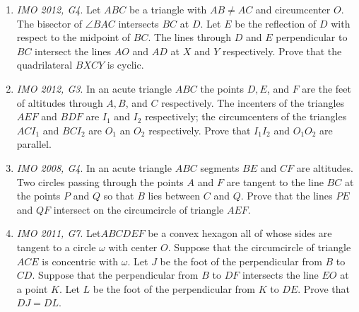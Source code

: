 \documentclass[11pt,a4paper]{article}
\begin{document}
\begin{enumerate}
\item\emph {IMO 2012, G4}. Let $ABC$ be a triangle with $AB\neq AC$ and circumcenter $O$. The bisector of $\angle BAC$ intersects $BC$ at $D$. Let $E$ be the reflection of $D$ with respect to the midpoint of $BC$. The lines through $D$ and $E$ perpendicular to $BC$ intersect the lines $AO$ and $AD$ at $X$ and $Y$ respectively. Prove that the quadrilateral $BXCY$ is cyclic.

\item\emph {IMO 2012, G3}. In an acute triangle $ABC$ the points $D, E$, and $F$ are the feet of altitudes through $A, B$, and $C$ respectively.  The incenters of the triangles $AEF$ and $BDF$ are $I_1$ and $I_2$ respectively; the circumcenters of the triangles $ACI_1$ and $BCI_2$ are $O_1$ an $O_2$ respectively. Prove that $I_1I_2$ and $O_1O_2$ are parallel.

\item\emph {IMO 2008, G4}. In an acute triangle $ABC$ segments $BE$ and $CF$ are altitudes.  Two circles passing through the points $A$ and $F$ are tangent to the line $BC$ at the points $P$ and $Q$ so that $B$ lies between $C$ and $Q$. Prove that the lines $PE$ and $QF$ intersect on the circumcircle of triangle $AEF$.

\item\emph {IMO 2011, G7}. Let$ABCDEF$ be a convex hexagon all of whose sides are tangent to a circle $\omega$ with center $O$. Suppose that the circumcircle of triangle $ACE$ is concentric with $\omega$. Let $J$ be the foot of the perpendicular from $B$ to $CD$. Suppose that the perpendicular from $B$ to $DF$ intersects the line $EO$ at a point $K$. Let $L$ be the foot of the perpendicular from $K$ to $DE$. Prove that $DJ=DL$.

\end{enumerate}
\end{document}
